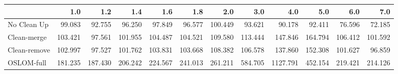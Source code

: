 \begin{tabular}{lrrrrrrrrrrr}
\toprule
{} &     1.0 &     1.2 &     1.4 &     1.6 &     1.8 &     2.0 &     3.0 &      4.0 &     5.0 &     6.0 &     7.0 \\
\midrule
No Clean Up  &  99.083 &  92.755 &  96.250 &  97.849 &  96.577 & 100.449 &  93.621 &   90.178 &  92.411 &  76.596 &  72.185 \\
Clean-merge  & 103.421 &  97.561 & 101.955 & 104.487 & 104.521 & 109.580 & 113.444 &  147.846 & 164.794 & 106.412 & 101.592 \\
Clean-remove & 102.997 &  97.527 & 101.762 & 103.831 & 103.668 & 108.382 & 106.578 &  137.860 & 152.308 & 101.627 &  96.859 \\
OSLOM-full   & 181.235 & 187.430 & 206.242 & 224.567 & 241.013 & 261.211 & 584.705 & 1127.791 & 452.154 & 219.421 & 214.126 \\
\bottomrule
\end{tabular}
